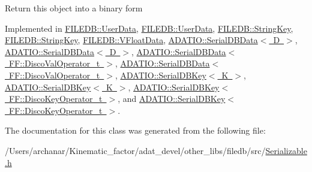 Return this object into a binary form 

Implemented in \mbox{\hyperlink{classFILEDB_1_1UserData_a42b5e25b3cba7274363590c5b6861795}{F\+I\+L\+E\+D\+B\+::\+User\+Data}}, \mbox{\hyperlink{classFILEDB_1_1UserData_a42b5e25b3cba7274363590c5b6861795}{F\+I\+L\+E\+D\+B\+::\+User\+Data}}, \mbox{\hyperlink{classFILEDB_1_1StringKey_a29db7eea425c851c5e0a4336d7a85fb1}{F\+I\+L\+E\+D\+B\+::\+String\+Key}}, \mbox{\hyperlink{classFILEDB_1_1StringKey_a29db7eea425c851c5e0a4336d7a85fb1}{F\+I\+L\+E\+D\+B\+::\+String\+Key}}, \mbox{\hyperlink{classFILEDB_1_1VFloatData_afad9c7e520cdd7bf9ae0b477b8a5f1f1}{F\+I\+L\+E\+D\+B\+::\+V\+Float\+Data}}, \mbox{\hyperlink{classADATIO_1_1SerialDBData_a5266e4f1c065f0776f9974d6fad51a2f}{A\+D\+A\+T\+I\+O\+::\+Serial\+D\+B\+Data$<$ D $>$}}, \mbox{\hyperlink{classADATIO_1_1SerialDBData_a5266e4f1c065f0776f9974d6fad51a2f}{A\+D\+A\+T\+I\+O\+::\+Serial\+D\+B\+Data$<$ D $>$}}, \mbox{\hyperlink{classADATIO_1_1SerialDBData_a5266e4f1c065f0776f9974d6fad51a2f}{A\+D\+A\+T\+I\+O\+::\+Serial\+D\+B\+Data$<$ F\+F\+::\+Disco\+Val\+Operator\+\_\+t $>$}}, \mbox{\hyperlink{classADATIO_1_1SerialDBData_a5266e4f1c065f0776f9974d6fad51a2f}{A\+D\+A\+T\+I\+O\+::\+Serial\+D\+B\+Data$<$ F\+F\+::\+Disco\+Val\+Operator\+\_\+t $>$}}, \mbox{\hyperlink{classADATIO_1_1SerialDBKey_a6e2d9bbd18a3fa5e049f0ad5321d328a}{A\+D\+A\+T\+I\+O\+::\+Serial\+D\+B\+Key$<$ K $>$}}, \mbox{\hyperlink{classADATIO_1_1SerialDBKey_a6e2d9bbd18a3fa5e049f0ad5321d328a}{A\+D\+A\+T\+I\+O\+::\+Serial\+D\+B\+Key$<$ K $>$}}, \mbox{\hyperlink{classADATIO_1_1SerialDBKey_a6e2d9bbd18a3fa5e049f0ad5321d328a}{A\+D\+A\+T\+I\+O\+::\+Serial\+D\+B\+Key$<$ F\+F\+::\+Disco\+Key\+Operator\+\_\+t $>$}}, and \mbox{\hyperlink{classADATIO_1_1SerialDBKey_a6e2d9bbd18a3fa5e049f0ad5321d328a}{A\+D\+A\+T\+I\+O\+::\+Serial\+D\+B\+Key$<$ F\+F\+::\+Disco\+Key\+Operator\+\_\+t $>$}}.



The documentation for this class was generated from the following file\+:\begin{DoxyCompactItemize}
\item 
/\+Users/archanar/\+Kinematic\+\_\+factor/adat\+\_\+devel/other\+\_\+libs/filedb/src/\mbox{\hyperlink{other__libs_2filedb_2src_2Serializable_8h}{Serializable.\+h}}\end{DoxyCompactItemize}
